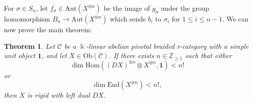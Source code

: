 \documentclass[11pt, reqno]{amsart}
\newtheorem{thm}{Theorem}[section]
\theoremstyle{definition}\newtheorem{defi}[thm]{Definition}
\theoremstyle{definition}\newtheorem{rem}[thm]{Remark}
\theoremstyle{definition}\newtheorem{exam}[thm]{Example}
\theoremstyle{definition}\newtheorem{assum}[thm]{Assumption}
\newcommand{\cC}{\mathcal{C}}
\newcommand{\ZZ}{\mathbb{Z}}
\newcommand{\vac}{\mathbf{1}}
\begin{document}
For $\sigma\in S_n$, let $f_\sigma\in\mathrm{Aut}(X^{\otimes n})$ be the image of $g_\sigma$ under
the group homomorphism $B_n\rightarrow\mathrm{Aut}(X^{\otimes n})$ which sends $b_i$ to $\sigma_i$ for $1\leq i\leq n-1$. We can now prove the main theorem:
\begin{thm}\label{thm:main-theorem}
Let $\cC$ be a $\Bbbk$-linear abelian pivotal braided r-category with a simple unit object $\vac$, and let $X\in\mathrm{Ob}(\cC)$. If there exists $n\in\ZZ_{\geq 1}$ such that either
\begin{equation*}
\dim\mathrm{Hom}((DX)^{\otimes n}\otimes X^{\otimes n},\vac)<n!
\end{equation*}
or
\begin{equation*}
\dim\mathrm{End}(X^{\otimes n})<n!,
\end{equation*}
then $X$ is rigid with left dual $DX$.
\end{thm}
\end{document}
